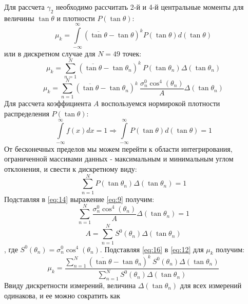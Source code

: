 Для рассчета $\gamma_2$ необходимо рассчитать 2-й и 4-й центральные моменты для величины $\tan \theta$ и плотности $P(\tan \theta)$:
\begin{equation}
  \mu_k = \int \limits_{-\infty}^{\infty}(\overline{\tan \theta}-\tan \theta)^k P(\tan \theta) d(\tan \theta)
  \label{eq:10}
\end{equation} 
или в дискретном случае для $N = 49$ точек:
\begin{equation}
  \mu_k = \sum \limits_{n = 1}^{N} (\overline{\tan\theta} - \tan \theta_n)^k ~P(\tan \theta_n) \Delta(\tan \theta_n)
  \label{eq:11}
\end{equation} 
\begin{equation}
  \mu_k = \sum \limits_{n = 1}^{N} (\overline{\tan\theta} - \tan \theta_n)^k~ \frac{\sigma^0_n \cos^4(\theta_n)}{A} \Delta(\tan \theta_n)
  \label{eq:12}
\end{equation}
Для рассчета коэффициента $A$ воспользуемся нормирокой плотности распределения $P(\tan \theta)$:
\begin{equation}
  \int \limits_{-\infty}^{\infty} f(x)dx = 1 \Rightarrow \int \limits_{-\infty}^{\infty} P(\tan \theta) d(\tan \theta) = 1
  \label{eq:13}
\end{equation}
От бесконечных пределов мы можем перейти к области интегрирования, ограниченной массивами данных - максимальным и
минимальным углом отклонения, и свести к дискретному виду:
\begin{equation}
  \sum \limits_{n = 1}^{N} P(\tan \theta_n) \Delta(\tan \theta_n) = 1
  \label{eq:14}
\end{equation}
Подставляя в \eqref{eq:14} выражение \eqref{eq:9} получим:
\begin{equation}
  \sum \limits_{n = 1}^{N} \frac{\sigma^0_n \cos^4(\theta_n)}{A} \Delta(\tan \theta_n) = 1
  \label{eq:15}
\end{equation}
\begin{equation}
  A = \sum \limits_{n = 1}^{N} S^0(\theta_n) \Delta(\tan \theta_n)
  \label{eq:16}
\end{equation}
, где $S^0(\theta_n) = \sigma^0_n \cos^4(\theta_n)$. Подставляя \eqref{eq:16} в \eqref{eq:12} для $\mu_k$ получим:
\begin{equation}
  \mu_k = \frac{\sum \limits_{n = 1}^{N} (\overline{\tan\theta} - \tan \theta_n)^k~ S^0(\theta_n) \Delta(\tan \theta_n)}{\sum \limits_{n = 1}^{N} S^0(\theta_n) \Delta(\tan \theta_n)}
  \label{eq:17}
\end{equation}
Ввиду дискретности измерений, величина $\Delta(\tan \theta_n)$ для всех измерений одинакова, и ее можно сократить как

